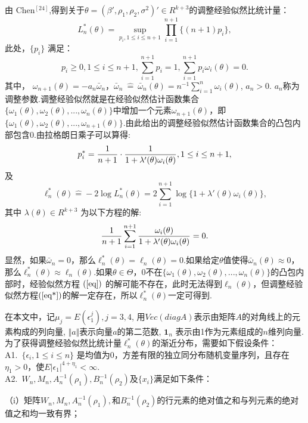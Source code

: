\documentclass[onecolumn]{ctexart}	%
\begin{document}
由 Chen$^{[24]}$,得到关于$\theta=(\beta', \rho_1,\rho_2,\sigma^2)'\in R^{k+3}$的调整经验似然比统计量：
\begin{equation}
L_n^*(\theta)=\sup_{p_i, 1\leq i\leq n+1} \prod^{n+1}_{i=1}\{(n+1)p_i\} , \label{Ln*} 
\end{equation}
此处，$\{p_i\}$ 满足：
$$p_i\geq 0, 1\leq i\leq n+1,  \sum^{n+1}_{i=1}p_i =1,  \sum^{n+1}_{i=1}p_i \omega_i(\theta)=0.$$
其中，
$\omega_{n+1}(\theta)=-a_n\bar{\omega}_{n}$，$\bar{\omega}_{n} \ \hat{=} \ \bar{\omega}_{n}(\theta)= n^{-1} \sum^n_{i=1}\omega_i(\theta)$, $a_n>0$. $a_n$称为调整参数.调整经验似然就是在经验似然估计函数集合$\{\omega_{1}(\theta),\omega_{2}(\theta),...,\omega_{n}(\theta)\}$中增加一个元素$\omega_{n+1}(\theta)$，即$\{\omega_{1}(\theta),\omega_{2}(\theta),...,\omega_{n+1}(\theta)\}$.由此给出的调整经验似然估计函数集合的凸包内部包含0.由拉格朗日乘子可以算得:
$$ p_i ^*={ 1\over n+1}\cdot{1 \over 1+\lambda'(\theta)\omega_i(\theta)},1\leq i\leq n+1,$$
及
\begin{equation}
\ell^*_n(\theta)\hat{=} -2\log L_n^*(\theta)=2\sum^{n+1}_{i=1}\log \{1+\lambda'(\theta)\omega_i(\theta)\},   \label{ln*} 
\end{equation}
其中 $\lambda(\theta)\in R^{k+3}$ 为以下方程的解:
\begin{equation}
	{1\over n+1}\sum^{n+1}_{i=1}{\omega_i(\theta)\over 1+\lambda'(\theta)\omega_i(\theta)}=0.   \label{eq*} 
\end{equation}
显然，如果$\bar{\omega}_{n}=0$，那么$\ell^*_n(\theta)=\ell_n(\theta)=0$.如果给定$\theta$值使得$\bar{\omega}_{n}(\theta)\approx 0$，那么$\ell^*_n(\theta)\approx\ell_n(\theta)$.如果$\theta \in\Theta$，0不在$\{\omega_{1}(\theta),\omega_{2}(\theta),...,\omega_{n}(\theta)\}$的凸包内部时，经验似然方程 $(\ref{eq})$ 的解可能不存在，此时无法得到$\ell_n(\theta)$，但调整经验似然方程$(\ref{eq*})$的解一定存在，所以$\ell^*_n(\theta)$一定可得到.

在本文中，记$\mu_j=E(\epsilon_1^j),j=3,4$, 用$Vec(diag⁡A )$表示由矩阵$A$的对角线上的元素构成的列向量, $\Vert a \Vert$表示向量$a$的第二范数, $\bm{1}_n$ 表示由1作为元素组成的$n$维列向量.为了获得调整经验似然比统计量$\ell^*_n(\theta)$的渐近分布，需要如下假设条件：\\
A1.\  $\{\epsilon_{i}, 1\leq i\leq n\}$ 是均值为0，方差有限的独立同分布随机变量序列，且存在$\eta_1 > 0$，使$E|\epsilon_{1}|^{4+\eta_1 }<\infty$.\\
A2.\ $W_n,M_n,A_n^{-1} (\rho_1 ),B_n^{-1} (\rho_2 )$及$\{x_i \}$满足如下条件：

（i）矩阵$W_n,M_n,A_n^{-1} (\rho_1 ),$和$B_n^{-1} (\rho_2 )$的行元素的绝对值之和与列元素的绝对值之和均一致有界；
\end{document}
